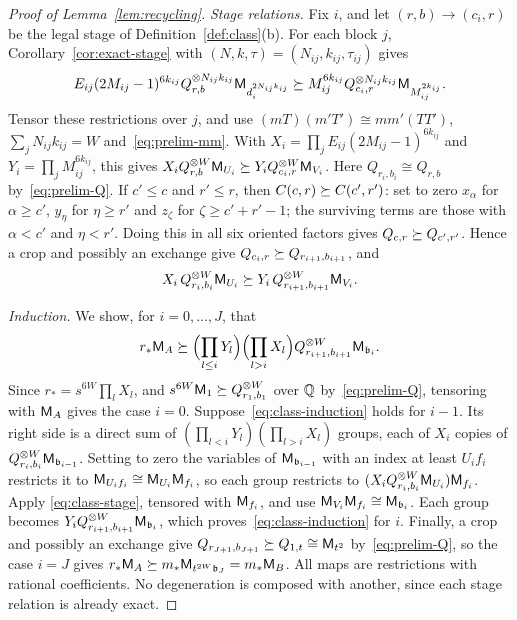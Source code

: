\begin{proof}[Proof of Lemma~\ref{lem:recycling}]
\emph{Stage relations.} Fix \(i\), and let \((r,b)\to(c_i,r)\) be the
legal stage of Definition~\ref{def:class}(b). For each block \(j\),
Corollary~\ref{cor:exact-stage} with
\((N,k,\tau)=(N_{ij},k_{ij},\tau_{ij})\) gives
\[
 E_{ij}(2M_{ij}-1)^{6k_{ij}}Q_{r,b}^{\otimes N_{ij}k_{ij}}\mathsf M_{d_i^{2N_{ij}k_{ij}}}
 \succeq M_{ij}^{6k_{ij}}Q_{c_i,r}^{\otimes N_{ij}k_{ij}}\mathsf M_{M_{ij}^{2k_{ij}}} .
\]
Tensor these restrictions over \(j\), and use \((mT)(m'T')\cong mm'(TT')\),
\(\sum_jN_{ij}k_{ij}=W\) and~\eqref{eq:prelim-mm}. With
\(X_i=\prod_jE_{ij}(2M_{ij}-1)^{6k_{ij}}\) and
\(Y_i=\prod_jM_{ij}^{6k_{ij}}\), this gives
\(X_iQ_{r,b}^{\otimes W}\mathsf M_{U_i}\succeq Y_iQ_{c_i,r}^{\otimes W}\mathsf M_{V_i}\).
Here \(Q_{r_i,b_i}\cong Q_{r,b}\) by~\eqref{eq:prelim-Q}. If
\(c'\le c\) and \(r'\le r\), then \(C(c,r)\succeq C(c',r')\): set to zero
\(x_\alpha\) for \(\alpha\ge c'\), \(y_\eta\) for \(\eta\ge r'\) and
\(z_\zeta\) for \(\zeta\ge c'+r'-1\); the surviving terms are those with
\(\alpha<c'\) and \(\eta<r'\). Doing this in all six oriented factors
gives \(Q_{c,r}\succeq Q_{c',r'}\). Hence a crop and possibly an exchange give
\(Q_{c_i,r}\succeq Q_{r_{i+1},b_{i+1}}\), and
\begin{equation}\label{eq:class-stage}
 X_i\,Q_{r_i,b_i}^{\otimes W}\mathsf M_{U_i}\succeq
 Y_i\,Q_{r_{i+1},b_{i+1}}^{\otimes W}\mathsf M_{V_i}.
\end{equation}

\emph{Induction.} We show, for \(i=0,\ldots,J\), that
\begin{equation}\label{eq:class-induction}
 r_*\mathsf M_A\succeq\Bigl(\prod_{l\le i}Y_l\Bigr)\Bigl(\prod_{l>i}X_l\Bigr)
 Q_{r_{i+1},b_{i+1}}^{\otimes W}\mathsf M_{\mathfrak b_i} .
\end{equation}
Since \(r_*=s^{6W}\prod_lX_l\), and \(s^{6W}\mathsf M_1\succeq Q_{r_1,b_1}^{\otimes W}\)
over \(\mathbb Q\) by~\eqref{eq:prelim-Q}, tensoring with \(\mathsf M_A\) gives the
case \(i=0\). Suppose~\eqref{eq:class-induction} holds for \(i-1\). Its
right side is a direct sum of \((\prod_{l<i}Y_l)(\prod_{l>i}X_l)\)
groups, each of \(X_i\) copies of
\(Q_{r_i,b_i}^{\otimes W}\mathsf M_{\mathfrak b_{i-1}}\). Setting to zero the
variables of \(\mathsf M_{\mathfrak b_{i-1}}\) with an index at least \(U_if_i\)
restricts it to \(\mathsf M_{U_if_i}\cong\mathsf M_{U_i}\mathsf M_{f_i}\), so each group
restricts to \((X_iQ_{r_i,b_i}^{\otimes W}\mathsf M_{U_i})\mathsf M_{f_i}\). Apply
\eqref{eq:class-stage}, tensored with \(\mathsf M_{f_i}\), and use
\(\mathsf M_{V_i}\mathsf M_{f_i}\cong\mathsf M_{\mathfrak b_i}\). Each group becomes
\(Y_iQ_{r_{i+1},b_{i+1}}^{\otimes W}\mathsf M_{\mathfrak b_i}\), which
proves~\eqref{eq:class-induction} for \(i\). Finally, a crop and
possibly an exchange give \(Q_{r_{J+1},b_{J+1}}\succeq Q_{1,t}\cong\mathsf M_{t^2}\)
by~\eqref{eq:prelim-Q}, so the case \(i=J\) gives
\(r_*\mathsf M_A\succeq m_*\mathsf M_{t^{2W}\mathfrak b_J}=m_*\mathsf M_B\). All maps are
restrictions with rational coefficients. No degeneration is composed
with another, since each stage relation is already exact.


\end{proof}
